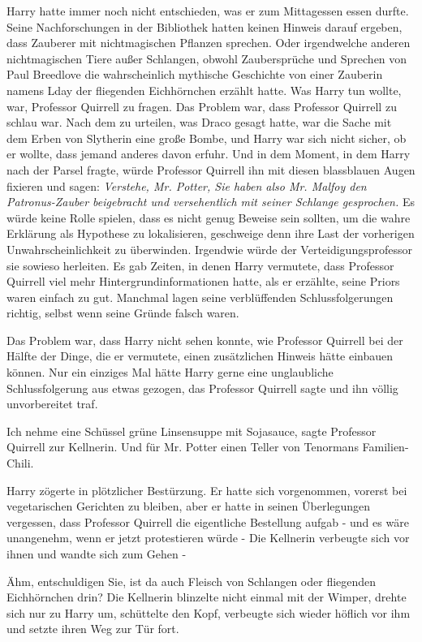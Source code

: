 Harry hatte immer noch nicht entschieden, was er zum Mittagessen essen durfte.
Seine Nachforschungen in der Bibliothek hatten keinen Hinweis darauf ergeben,
dass Zauberer mit nichtmagischen Pflanzen sprechen. Oder irgendwelche anderen
nichtmagischen Tiere außer Schlangen, obwohl Zaubersprüche und Sprechen von Paul
Breedlove die wahrscheinlich mythische Geschichte von einer Zauberin namens Lday
der fliegenden Eichhörnchen erzählt hatte. Was Harry tun wollte, war, Professor
Quirrell zu fragen. Das Problem war, dass Professor Quirrell zu schlau war. Nach
dem zu urteilen, was Draco gesagt hatte, war die Sache mit dem Erben von
Slytherin eine große Bombe, und Harry war sich nicht sicher, ob er wollte, dass
jemand anderes davon erfuhr. Und in dem Moment, in dem Harry nach der Parsel
fragte, würde Professor Quirrell ihn mit diesen blassblauen Augen fixieren und
sagen:
\emph{Verstehe, Mr. Potter, Sie haben also Mr. Malfoy den Patronus-Zauber
beigebracht und versehentlich mit seiner Schlange gesprochen.}
Es würde keine Rolle spielen, dass es nicht genug Beweise sein sollten, um die
wahre Erklärung als Hypothese zu lokalisieren, geschweige denn ihre Last der
vorherigen Unwahrscheinlichkeit zu überwinden. Irgendwie würde der
Verteidigungsprofessor sie sowieso herleiten. Es gab Zeiten, in denen Harry
vermutete, dass Professor Quirrell viel mehr Hintergrundinformationen hatte, als
er erzählte, seine Priors waren einfach zu gut. Manchmal lagen seine
verblüffenden Schlussfolgerungen richtig, selbst wenn seine Gründe falsch waren.

Das Problem war, dass Harry nicht sehen konnte, wie Professor Quirrell bei der
Hälfte der Dinge, die er vermutete, einen zusätzlichen Hinweis hätte einbauen
können. Nur ein einziges Mal hätte Harry gerne eine unglaubliche
Schlussfolgerung aus etwas gezogen, das Professor Quirrell sagte und ihn völlig
unvorbereitet traf.

\glqq{}Ich nehme eine Schüssel grüne Linsensuppe mit Sojasauce\grqq{}, sagte
Professor Quirrell zur Kellnerin. \glqq{}Und für Mr. Potter einen Teller von
Tenormans Familien-Chili.\grqq{}

Harry zögerte in plötzlicher Bestürzung. Er hatte sich vorgenommen, vorerst bei
vegetarischen Gerichten zu bleiben, aber er hatte in seinen Überlegungen
vergessen, dass Professor Quirrell die eigentliche Bestellung aufgab - und es
wäre unangenehm, wenn er jetzt protestieren würde - Die Kellnerin verbeugte sich
vor ihnen und wandte sich zum Gehen -

\glqq{}Ähm, entschuldigen Sie, ist da auch Fleisch von Schlangen oder fliegenden
Eichhörnchen drin?\grqq{} Die Kellnerin blinzelte nicht einmal mit der Wimper, drehte
sich nur zu Harry um, schüttelte den Kopf, verbeugte sich wieder höflich vor ihm
und setzte ihren Weg zur Tür fort.

